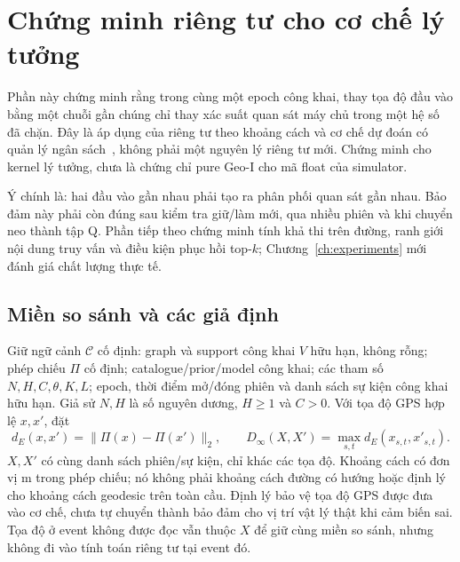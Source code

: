 \section{Chứng minh riêng tư cho cơ chế lý tưởng}
\label{sec:formal-current-privacy}
\label{sec:current-ideal-claim}

Phần này chứng minh rằng trong cùng một epoch công khai, thay tọa độ đầu vào
bằng một chuỗi gần chúng chỉ thay xác suất quan sát máy chủ trong một hệ số
đã chặn. Đây là áp dụng của riêng tư theo khoảng cách và cơ chế dự đoán có quản lý
ngân sách~\cite{andres2013geoi,chatzikokolakis2014predictive}, không phải
một nguyên lý riêng tư mới. Chứng minh cho kernel lý tưởng, chưa là chứng chỉ pure Geo-I
cho mã float của simulator.

Ý chính là: hai đầu vào gần nhau phải tạo ra phân phối quan sát gần nhau. Bảo đảm này phải còn đúng sau kiểm tra giữ/làm mới, qua nhiều phiên và khi chuyển neo thành tập Q. Phần tiếp theo chứng minh tính khả thi trên đường, ranh giới nội dung truy vấn và điều kiện phục hồi top-$k$; Chương~\ref{ch:experiments} mới đánh giá chất lượng thực tế.

\subsection{Miền so sánh và các giả định}
\label{sec:formal-privacy-assumptions}

Giữ ngữ cảnh $\mathcal C$ cố định: graph và support công khai $V$ hữu hạn,
không rỗng; phép chiếu $\Pi$ cố định; catalogue/prior/model công khai; các
tham số $N,H,C,\theta,K,L$; epoch, thời điểm mở/đóng phiên và danh sách sự
kiện công khai hữu hạn. Giả sử $N,H$ là số nguyên dương, $H\geq1$ và
$C>0$. Với tọa độ GPS hợp lệ $x,x'$, đặt
\begin{equation}
 d_E(x,x')=\|\Pi(x)-\Pi(x')\|_2,\qquad
 D_\infty(X,X')=\max_{s,t}d_E(x_{s,t},x'_{s,t}).
 \label{eq:formal-trace-metric}
\end{equation}
$X,X'$ có cùng danh sách phiên/sự kiện, chỉ khác các tọa độ. Khoảng cách có
đơn vị m trong phép chiếu; nó không phải khoảng cách đường có hướng hoặc
định lý cho khoảng cách geodesic trên toàn cầu. Định lý bảo vệ tọa độ GPS được đưa vào cơ chế, chưa tự chuyển thành bảo đảm cho vị trí vật lý thật khi cảm biến sai. Tọa độ ở event không được
đọc vẫn thuộc $X$ để giữ cùng miền so sánh, nhưng không đi vào tính toán
riêng tư tại event đó.

